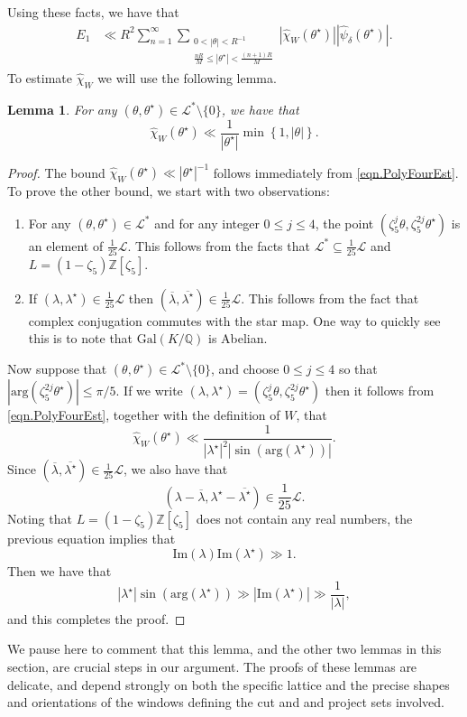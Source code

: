 \documentclass[reqno]{amsart}
\newcommand{\Z}{\mathbb{Z}}
\newcommand{\Q}{\mathbb{Q}}
\newcommand{\mr}{\mathrm}
\newtheorem{lemma}[theorem]{Lemma}
\newcommand{\cL}{\mathcal{L}}
\begin{document}
Using these facts, we have that
\begin{align}
	E_1&\ll R^2\sum_{n=1}^\infty\sum_{\substack{0<|\theta|<R^{-1}\\\frac{nR}{M}\le |\theta^\star|<\frac{(n+1)R}{M}}}|\widehat{\chi}_{W}(\theta^\star)| |\widehat{\psi}_\delta(\theta^\star)|.\label{eqn.E1Bound1}
\end{align}
To estimate $\widehat{\chi}_W$ we will use the following lemma.
\begin{lemma}\label{lem.ChiWEst1}
	For any $(\theta,\theta^\star)\in \cL^*\setminus\{0\}$, we have that
	\[\widehat{\chi}_W(\theta^\star)\ll\frac{1}{|\theta^\star|}\min\left\{1,|\theta|\right\}.\]
\end{lemma}
\begin{proof}
	The bound $\widehat{\chi}_W(\theta^\star)\ll|\theta^\star|^{-1}$ follows immediately from \eqref{eqn.PolyFourEst}. To prove the other bound, we start with two observations:
	\begin{enumerate}[topsep=2pt,itemsep=4pt,parsep=4pt]
		\item[(i)] For any $(\theta,\theta^\star)\in\cL^*$ and for any integer $0\le j\le 4$, the point $(\zeta_5^j\theta,\zeta_5^{2j}\theta^\star)$ is an element of $\frac{1}{25}\cL$. This follows from the facts that $\cL^*\subseteq \frac{1}{25}\cL$ and $L=(1-\zeta_5)\Z[\zeta_5]$.
		\item[(ii)] If $(\lambda,\lambda^\star)\in\frac{1}{25}\cL$ then $(\overline{\lambda},\overline{\lambda^\star})\in\frac{1}{25}\cL$. This follows from the fact that complex conjugation commutes with the star map. One way to quickly see this is to note that $\mathrm{Gal}(K/\Q)$ is Abelian.
	\end{enumerate}
	Now suppose that $(\theta,\theta^\star)\in \cL^*\setminus\{0\}$, and choose $0\le j\le 4$ so that $|\mathrm{arg}(\zeta_5^{2j}\theta^\star)|\le \pi/5$. If we write $(\lambda,\lambda^\star)=(\zeta_5^j\theta,\zeta_5^{2j}\theta^\star)$ then it follows from \eqref{eqn.PolyFourEst}, together with the definition of $W$, that
	\begin{equation}\label{eqn.ChiWEst1}
		\widehat{\chi}_W(\theta^\star)\ll\frac{1}{|\lambda^\star|^2|\sin(\mathrm{arg}(\lambda^\star))|}.
	\end{equation}
	Since $(\overline{\lambda},\overline{\lambda^\star})\in\frac{1}{25}\cL$, we also have that
	\[(\lambda-\overline{\lambda},\lambda^\star-\overline{\lambda^\star})\in \frac{1}{25}\cL.\]
	Noting that $L=(1-\zeta_5)\Z[\zeta_5]$ does not contain any real numbers, the previous equation implies that
	\[\mr{Im}(\lambda)\mr{Im}(\lambda^\star)\gg 1.\]
	Then we have that
	\[|\lambda^\star|\sin(\mathrm{arg}(\lambda^\star))\gg |\mr{Im}(\lambda^\star)|\gg\frac{1}{|\lambda|},\]
	and this completes the proof.
\end{proof}
We pause here to comment that this lemma, and the other two lemmas in this section, are crucial steps in our argument. The proofs of these lemmas are delicate, and depend strongly on both the specific lattice and the precise shapes and orientations of the windows defining the cut and and project sets involved.
\end{document}
